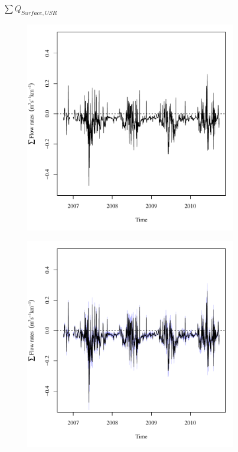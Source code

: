 \begin{linenumbers}
\subfiguretop
\begin{landscape}
	\begin{figure}
		\centering
		$ \displaystyle \sum Q_{Surface,USR} $
		\begin{subfigure}{0.7\textwidth}
			\centering
			\includegraphics[width=\tableCustomSize]{"Figures/Results_USR/Deterministic/Balance Water - flow"}
		\end{subfigure}%
		\begin{subfigure}{0.7\textwidth}
			\centering
			\includegraphics[width=\tableCustomSize]{"Figures/Results_USR/Stochastic/Balance Water - flow"}

\end{subfigure}
\end{figure}
\end{landscape}
\end{linenumbers}
